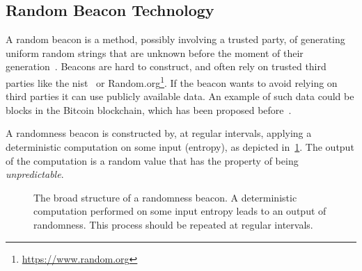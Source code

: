 \subsection{Random Beacon Technology}
A random beacon is a method, possibly involving a trusted party, of generating uniform random strings that are unknown before the moment of their generation~\cite{andrychowicz2014distributed}.
Beacons are hard to construct, and often rely on trusted third parties like the \acrfull{nist}~\cite{nistbeacon} or Random.org\footnote{\url{https://www.random.org}}.
If the beacon wants to avoid relying on third parties it can use publicly available data.
An example of such data could be blocks in the Bitcoin blockchain, which has been proposed before~\cite{bonneau2015bitcoin}.

A randomness beacon is constructed by, at regular intervals, applying a deterministic computation on some input (entropy), as depicted in~\cref{fig:beacon}. The output of the computation is a random value that has the property of being \emph{unpredictable}. 

\begin{figure}[htb]
    \centering
    \caption{The broad structure of a randomness beacon. A deterministic computation performed on some input entropy leads to an output of randomness. This process should be repeated at regular intervals.}
    \label{fig:beacon}
\end{figure}
